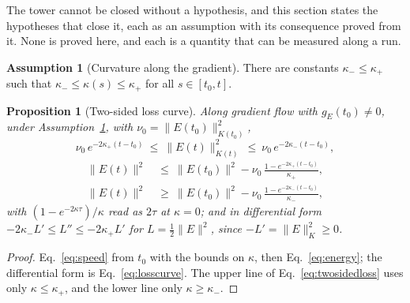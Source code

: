\documentclass[11pt]{article}
\newtheorem{proposition}{Proposition}
\theoremstyle{definition}
\newtheorem{assumption}{Assumption}
\theoremstyle{remark}
\begin{document}
The tower cannot be closed without a hypothesis, and this section states the hypotheses that close it, each as an assumption with its consequence proved from it.
None is proved here, and each is a quantity that can be measured along a run.

\begin{assumption}[Curvature along the gradient]\label{ass:curv}
There are constants $\kappa_-\le\kappa_+$ such that $\kappa_-\le\kappa(s)\le\kappa_+$ for all $s\in[t_0, t]$.
\end{assumption}

\begin{proposition}[Two-sided loss curve]\label{prop:curv}
Along gradient flow with $g_E(t_0)\neq0$, under Assumption~\ref{ass:curv}, with $\nu_0 = \|E(t_0)\|_{K(t_0)}^2$,
\begin{equation}\label{eq:twosided}
\nu_0\,e^{-2\kappa_+(t - t_0)}\ \le\ \|E(t)\|_{K(t)}^2\ \le\ \nu_0\,e^{-2\kappa_-(t - t_0)},
\end{equation}
\begin{equation}\label{eq:twosidedloss}
\begin{aligned}
\|E(t)\|^2\ &\le\ \|E(t_0)\|^2 - \nu_0\,\frac{1 - e^{-2\kappa_+(t - t_0)}}{\kappa_+},\\
\|E(t)\|^2\ &\ge\ \|E(t_0)\|^2 - \nu_0\,\frac{1 - e^{-2\kappa_-(t - t_0)}}{\kappa_-},
\end{aligned}
\end{equation}
with $(1 - e^{-2\kappa\tau})/\kappa$ read as $2\tau$ at $\kappa = 0$; and in differential form $-2\kappa_-L'\le L''\le-2\kappa_+L'$ for $L = \frac12\|E\|^2$, since $-L' = \|E\|_K^2\ge0$.
\end{proposition}

\begin{proof}
Eq.~\eqref{eq:speed} from $t_0$ with the bounds on $\kappa$, then Eq.~\eqref{eq:energy}; the differential form is Eq.~\eqref{eq:losscurve}.
The upper line of Eq.~\eqref{eq:twosidedloss} uses only $\kappa\le\kappa_+$, and the lower line only $\kappa\ge\kappa_-$.
\end{proof}
\end{document}
